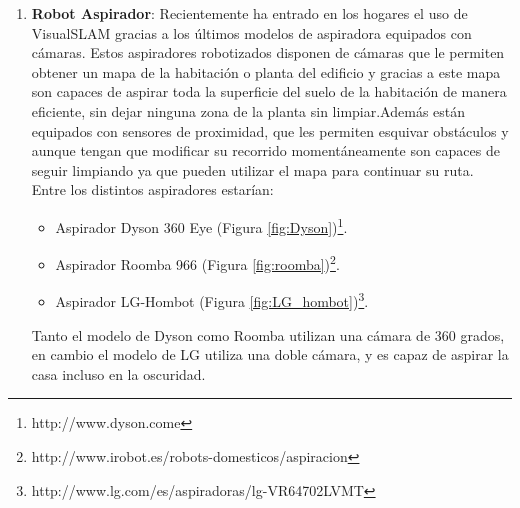 \begin {enumerate}
\item \textbf{Robot Aspirador}: Recientemente ha entrado en los hogares el uso de VisualSLAM gracias a los últimos modelos de aspiradora equipados con cámaras.
Estos aspiradores robotizados disponen de cámaras que le permiten obtener un mapa de la habitación o planta del edificio y gracias a este mapa son capaces de aspirar toda la superficie del suelo de la habitación de manera eficiente, sin dejar ninguna zona de la planta sin limpiar.Además están equipados con sensores de proximidad, que les permiten esquivar obstáculos y aunque tengan que modificar su recorrido momentáneamente son capaces de seguir limpiando ya que pueden utilizar el mapa para continuar su ruta. Entre los distintos aspiradores estarían:
\begin{itemize}
\item Aspirador Dyson 360 Eye (Figura \ref{fig:Dyson})\footnote{http://www.dyson.come}.
\item Aspirador Roomba 966 (Figura \ref{fig:roomba})\footnote{http://www.irobot.es/robots-domesticos/aspiracion}.
\item Aspirador LG-Hombot (Figura \ref{fig:LG_hombot})\footnote{http://www.lg.com/es/aspiradoras/lg-VR64702LVMT}.
\end{itemize}

Tanto el modelo de Dyson como Roomba utilizan una cámara de 360 grados, 
en cambio el modelo de LG utiliza una doble cámara, y es capaz de aspirar la casa incluso en la oscuridad.


\end{enumerate}
